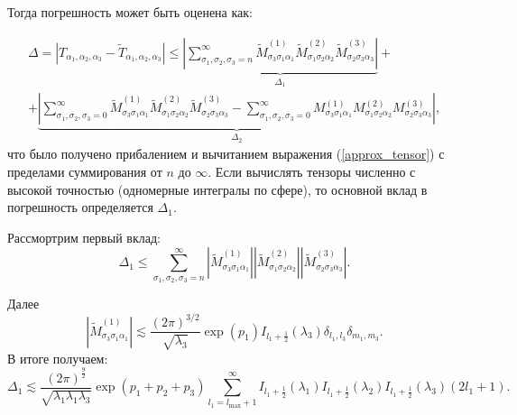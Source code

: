 \documentclass[12pt]{article}
\begin{document}
Тогда погрешность может быть оценена как:

\begin{multline}
  \Delta = \left| T_{\alpha_1, \alpha_2, \alpha_3} - \tilde{T}_{\alpha_1, \alpha_2, \alpha_3} \right| \leq \underbrace{\left| \sum\limits_{\sigma_1, \sigma_2, \sigma_3 = n}^{\infty}\tilde{M}^{(1)}_{\sigma_3\sigma_1\alpha_1}\tilde{M}^{(2)}_{\sigma_1\sigma_2\alpha_2}\tilde{M}^{(3)}_{\sigma_2\sigma_3\alpha_3} \right|}_{\Delta_1} 
  +\\+
  \underbrace{\left| \sum\limits_{\sigma_1, \sigma_2, \sigma_3 = 0}^{\infty}\tilde{M}^{(1)}_{\sigma_3\sigma_1\alpha_1}\tilde{M}^{(2)}_{\sigma_1\sigma_2\alpha_2}\tilde{M}^{(3)}_{\sigma_2\sigma_3\alpha_3} - \sum\limits_{\sigma_1, \sigma_2, \sigma_3 = 0}^{\infty}M^{(1)}_{\sigma_3\sigma_1\alpha_1}M^{(2)}_{\sigma_1\sigma_2\alpha_2}M^{(3)}_{\sigma_2\sigma_3\alpha_3} \right|}_{\Delta_2},
\end{multline}
что было получено прибалением и вычитанием выражения (\ref{approx_tensor}) с пределами суммирования от $n$ до $\infty$.
Если вычислять тензоры численно с высокой точностью (одномерные интегралы по сфере), то основной вклад в погрешность определяется $\Delta_1$.

Рассмортрим первый вклад:
\begin{equation}
  \Delta_1 \leq \sum\limits_{\sigma_1, \sigma_2, \sigma_3 = n}^{\infty}\left|\tilde{M}^{(1)}_{\sigma_3\sigma_1\alpha_1}\right| \left|\tilde{M}^{(2)}_{\sigma_1\sigma_2\alpha_2}\right| \left|\tilde{M}^{(3)}_{\sigma_2\sigma_3\alpha_3} \right|.
\end{equation}

Далее 
\begin{equation}
  \left|\tilde{M}^{(1)}_{\sigma_3\sigma_1\alpha_1}\right| \lesssim \frac{(2\pi)^{3/2}}{\sqrt{\lambda_3}}\exp(p_1)I_{l_1+\frac{1}{2}}(\lambda_3)\delta_{l_1, l_3}\delta_{m_1, m_3}.
\end{equation}
В итоге получаем:
\begin{equation}
  \Delta_1 \lesssim \frac{(2\pi)^{\frac{9}{2}}}{\sqrt{\lambda_1\lambda_1\lambda_3}}\exp(p_1+p_2+p_3)\sum_{l_1 = l_{\max}+1}^{\infty}I_{l_1+\frac{1}{2}}(\lambda_1)I_{l_1+\frac{1}{2}}(\lambda_2)I_{l_1+\frac{1}{2}}(\lambda_3)(2l_1+1).
\end{equation}


\end{document}
